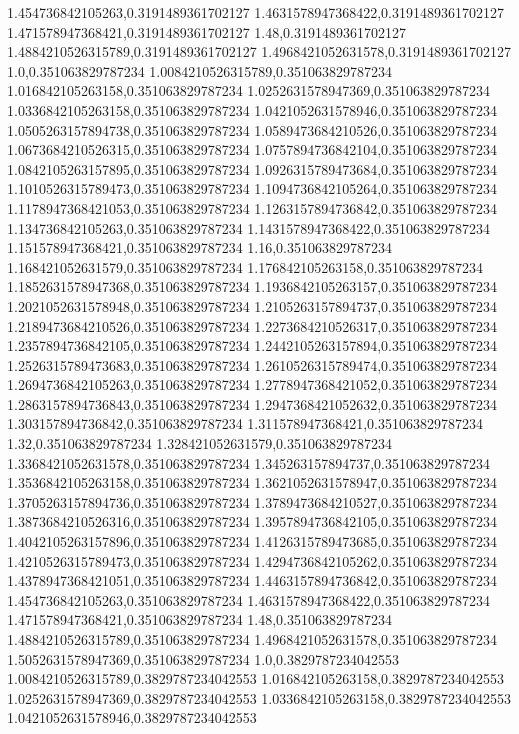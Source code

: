 1.454736842105263,0.3191489361702127
1.4631578947368422,0.3191489361702127
1.471578947368421,0.3191489361702127
1.48,0.3191489361702127
1.4884210526315789,0.3191489361702127
1.4968421052631578,0.3191489361702127
1.0,0.351063829787234
1.0084210526315789,0.351063829787234
1.016842105263158,0.351063829787234
1.0252631578947369,0.351063829787234
1.0336842105263158,0.351063829787234
1.0421052631578946,0.351063829787234
1.0505263157894738,0.351063829787234
1.0589473684210526,0.351063829787234
1.0673684210526315,0.351063829787234
1.0757894736842104,0.351063829787234
1.0842105263157895,0.351063829787234
1.0926315789473684,0.351063829787234
1.1010526315789473,0.351063829787234
1.1094736842105264,0.351063829787234
1.1178947368421053,0.351063829787234
1.1263157894736842,0.351063829787234
1.134736842105263,0.351063829787234
1.1431578947368422,0.351063829787234
1.151578947368421,0.351063829787234
1.16,0.351063829787234
1.168421052631579,0.351063829787234
1.176842105263158,0.351063829787234
1.1852631578947368,0.351063829787234
1.1936842105263157,0.351063829787234
1.2021052631578948,0.351063829787234
1.2105263157894737,0.351063829787234
1.2189473684210526,0.351063829787234
1.2273684210526317,0.351063829787234
1.2357894736842105,0.351063829787234
1.2442105263157894,0.351063829787234
1.2526315789473683,0.351063829787234
1.2610526315789474,0.351063829787234
1.2694736842105263,0.351063829787234
1.2778947368421052,0.351063829787234
1.2863157894736843,0.351063829787234
1.2947368421052632,0.351063829787234
1.303157894736842,0.351063829787234
1.311578947368421,0.351063829787234
1.32,0.351063829787234
1.328421052631579,0.351063829787234
1.3368421052631578,0.351063829787234
1.345263157894737,0.351063829787234
1.3536842105263158,0.351063829787234
1.3621052631578947,0.351063829787234
1.3705263157894736,0.351063829787234
1.3789473684210527,0.351063829787234
1.3873684210526316,0.351063829787234
1.3957894736842105,0.351063829787234
1.4042105263157896,0.351063829787234
1.4126315789473685,0.351063829787234
1.4210526315789473,0.351063829787234
1.4294736842105262,0.351063829787234
1.4378947368421051,0.351063829787234
1.4463157894736842,0.351063829787234
1.454736842105263,0.351063829787234
1.4631578947368422,0.351063829787234
1.471578947368421,0.351063829787234
1.48,0.351063829787234
1.4884210526315789,0.351063829787234
1.4968421052631578,0.351063829787234
1.5052631578947369,0.351063829787234
1.0,0.3829787234042553
1.0084210526315789,0.3829787234042553
1.016842105263158,0.3829787234042553
1.0252631578947369,0.3829787234042553
1.0336842105263158,0.3829787234042553
1.0421052631578946,0.3829787234042553
